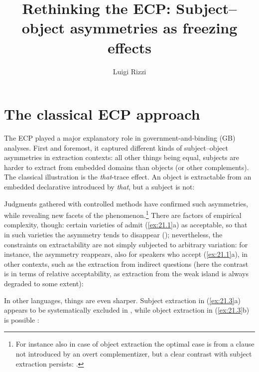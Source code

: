 \documentclass[output=paper]{langsci/langscibook}
\author{Luigi Rizzi\affiliation{Collège de France}}
\title{Rethinking the ECP: Subject--object asymmetries as freezing effects}
\begin{document}
\glsresetall
\maketitle

\section{The classical ECP approach}

The \gls{ECP} played a major explanatory role in
govern\-ment-and-binding (\gls{GB}) analyses.  First and foremost,
it captured different kinds of subject--object asymmetries in extraction
contexts: all other things being equal, subjects are harder to extract from
embedded domains than objects (or other complements).  The classical
illustration is the \emph{that}-trace effect. An object is extractable from an
embedded declarative introduced by \emph{that}, but a subject is not:\largerpage

\ea%
    \label{ex:21.1}
    \z
\z
%
Judgments gathered with controlled methods have confirmed such asymmetries,
while revealing new facets of the phenomenon.\footnote{For instance also in
    case of object extraction the optimal case is from a clause not introduced
    by an overt complementizer, but a clear contrast with
    subject extraction persists: \citet{Schippers2012}.} There are factors of
    empirical complexity, though: certain varieties of  admit
    (\ref{ex:21.1}a) as acceptable, so that in such varieties the asymmetry
    tends to disappear (\citealt{Sobin2002,Schippers2012}); nevertheless, the
    constraints on extractability are not simply subjected to arbitrary
    variation: for instance, the asymmetry reappears, also for speakers who
    accept (\ref{ex:21.1}a), in other contexts, such as the extraction from
    indirect questions (here the contrast is in terms of relative
    acceptability, as extraction from the weak island is always
    degraded to some extent):

\ea%
    \label{ex:21.2}
    \z
\z
%
In other languages, things are even sharper. Subject extraction in
(\ref{ex:21.3}a) appears to be systematically excluded in ,
while object extraction in (\ref{ex:21.3}b) is possible
\citep{Berthelot2017}:
\end{document}
